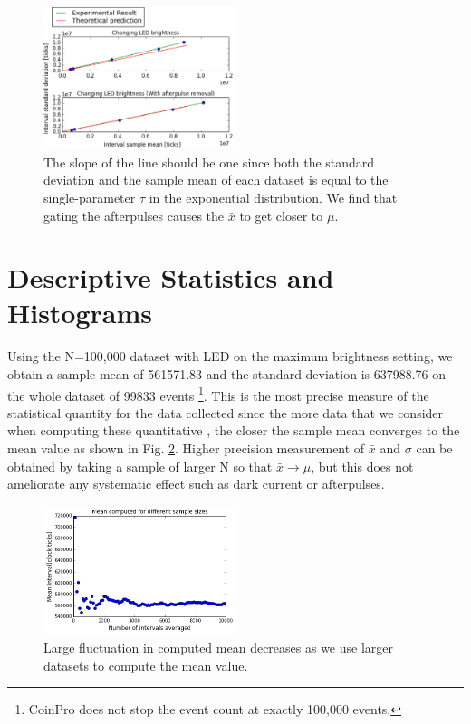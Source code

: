 \documentclass[authoryear, 12pt,5p, Times]{elsarticle}
\begin{document}
\begin{figure}[h]
\centering
\includegraphics[width=0.5\textwidth]{figures/changeLED}
\caption{The slope of the line should be one since both the standard deviation and the sample mean of each dataset is equal to the single-parameter $\tau$ in the exponential distribution. We find that gating the afterpulses causes the $\bar{x}$ to get closer to $\mu$. }
\label{changeLED}
\end{figure}
\section{Descriptive Statistics and Histograms\label{stats}}
Using the N=100,000 dataset with LED on the maximum brightness setting, we obtain a sample mean of 561571.83 and the standard deviation is  637988.76 on the whole dataset of 99833 events \footnote{CoinPro does not stop the event count at exactly 100,000 events.}. This is the most precise measure of the statistical quantity for the data collected since the more data that we consider when computing these quantitative , the closer the sample mean converges to the mean value as shown in Fig. \ref{stat_converging}. Higher precision measurement of $\bar{x} $ and $\sigma$ can be obtained by taking a sample of larger N so that $\bar{x} \rightarrow \mu$, but this does not ameliorate any systematic effect such as dark current or afterpulses.
 	\begin{figure}[h]
		\includegraphics[width=0.5\textwidth]{figures/converging_mean}
		\caption{Large fluctuation in computed mean decreases as we use larger datasets to compute the mean value.}
		\label{stat_converging}
	\end{figure}
\end{document}

